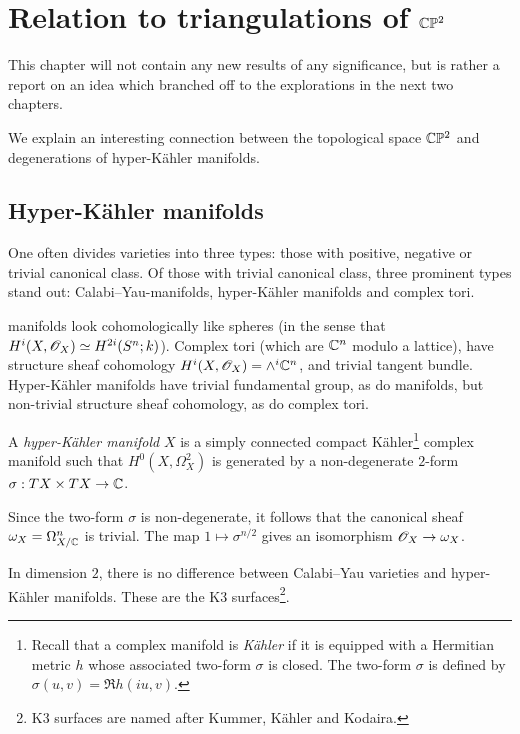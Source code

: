 \chapter{Relation to triangulations of \texorpdfstring{$\mathbb{C}\mathbb{P}^2$}{CP2}}
\label{sec:cp2triangs}

This chapter will not contain any new results of any significance, but is rather a report on an idea which branched off to the explorations in the next two chapters.

We explain an interesting connection between the topological space $\mathbb{C} \mathbb{P}^2$ and degenerations of hyper-Kähler manifolds.

\section{Hyper-Kähler manifolds} %
\label{sec:hyper_kähler_manifolds}

One often divides varieties into three types: those with positive, negative or trivial canonical class. Of those with trivial canonical class, three prominent types stand out: Calabi--Yau-manifolds, hyper-Kähler manifolds and complex tori.

\CY manifolds look cohomologically like spheres (in the sense that $H^i(X,\mathscr{O}_X) \simeq H^{2i}(S^n; k)$). Complex tori (which are $\mathbb{C}^n$ modulo a lattice), have structure sheaf cohomology $H^i(X,\mathscr{O}_X) = \wedge^i \mathbb{C}^n$, and trivial tangent bundle. Hyper-Kähler manifolds have trivial fundamental group, as do \CY manifolds, but non-trivial structure sheaf cohomology, as do complex tori.

\begin{definition}
A \emph{hyper-Kähler manifold} $X$ is a simply connected compact Kähler\footnote{Recall that a complex manifold is \emph{Kähler} if it is equipped with a Hermitian metric $h$ whose associated two-form $\sigma$ is closed. The two-form $\sigma$ is defined by $\sigma(u,v) = \Re h(iu,v)$.} complex manifold such that $H^0(X, \Omega_X^2)$ is generated by a non-degenerate $2$-form $\sigma: TX \times TX \to \mathbb{C}$.
\end{definition}

\begin{remark}
Since the two-form $\sigma$ is non-degenerate, it follows that the canonical sheaf $\omega_X=\Omega_{X/\mathbb{C}}^n$ is trivial. The map $1 \mapsto \sigma^{n/2}$ gives an isomorphism $\mathscr{O}_X \to \omega_X$. 
\end{remark}

\begin{remark}
In dimension $2$, there is no difference between Calabi--Yau varieties and hyper-Kähler manifolds. These are the K3 surfaces\footnote{K3 surfaces are named after Kummer, Kähler and Kodaira.}. 
\end{remark}

